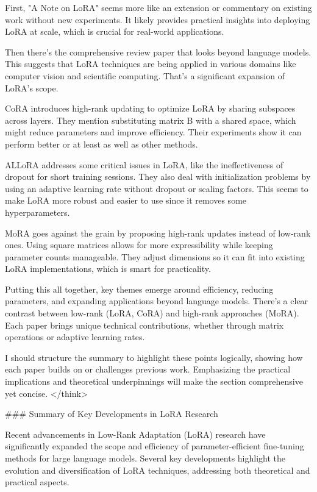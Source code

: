 \documentclass[conference]{IEEEtran}
\begin{document}
First, "A Note on LoRA" seems more like an extension or commentary on existing work without new experiments. It likely provides practical insights into deploying LoRA at scale, which is crucial for real-world applications.

Then there's the comprehensive review paper that looks beyond language models. This suggests that LoRA techniques are being applied in various domains like computer vision and scientific computing. That's a significant expansion of LoRA's scope.

CoRA introduces high-rank updating to optimize LoRA by sharing subspaces across layers. They mention substituting matrix B with a shared space, which might reduce parameters and improve efficiency. Their experiments show it can perform better or at least as well as other methods.

ALLoRA addresses some critical issues in LoRA, like the ineffectiveness of dropout for short training sessions. They also deal with initialization problems by using an adaptive learning rate without dropout or scaling factors. This seems to make LoRA more robust and easier to use since it removes some hyperparameters.

MoRA goes against the grain by proposing high-rank updates instead of low-rank ones. Using square matrices allows for more expressibility while keeping parameter counts manageable. They adjust dimensions so it can fit into existing LoRA implementations, which is smart for practicality.

Putting this all together, key themes emerge around efficiency, reducing parameters, and expanding applications beyond language models. There's a clear contrast between low-rank (LoRA, CoRA) and high-rank approaches (MoRA). Each paper brings unique technical contributions, whether through matrix operations or adaptive learning rates.

I should structure the summary to highlight these points logically, showing how each paper builds on or challenges previous work. Emphasizing the practical implications and theoretical underpinnings will make the section comprehensive yet concise.
</think>

### Summary of Key Developments in LoRA Research

Recent advancements in Low-Rank Adaptation (LoRA) research have significantly expanded the scope and efficiency of parameter-efficient fine-tuning methods for large language models. Several key developments highlight the evolution and diversification of LoRA techniques, addressing both theoretical and practical aspects.
\end{document}
